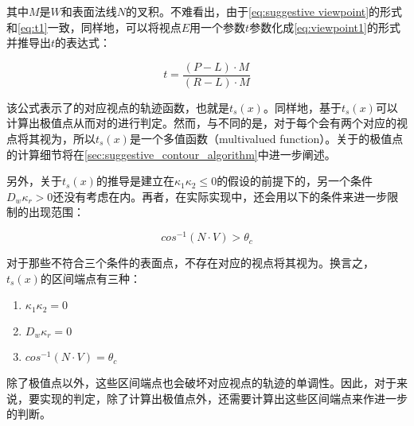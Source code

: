 其中$M$是$W$和表面法线$N$的叉积。不难看出，由于\autoref{eq:suggestive viewpoint}的形式和\autoref{eq:t1}一致，同样地，可以将视点$E$用一个参数$t$参数化成\autoref{eq:viewpoint1}的形式并推导出$t$的表达式：

\begin{equation}\label{eq:suggestive trajectory}
    t = \frac{(P-L)\cdot{M}}{(R-L)\cdot{M}}
\end{equation}

该公式表示了\scon{}的对应视点的轨迹函数，也就是$t_s(x)$。同样地，基于$t_s(x)$可以计算出极值点从而对\scon{}的\epsl{}进行判定。然而，与\con{}不同的是，对于每个\sconp{}会有两个对应的视点将其视为\sconp{}，所以$t_s(x)$是一个多值函数（multivalued function）。关于\scon{}的极值点的计算细节将在\ref{sec:suggestive_contour_algorithm}中进一步阐述。

另外，关于$t_s(x)$的推导是建立在$\kappa_1\kappa_2 \leq 0$的假设的前提下的，另一个条件$D_w\kappa_r>0$还没有考虑在内。再者，在实际实现中，还会用以下的条件来进一步限制\scon{}的出现范围：

\begin{equation}\label{eq:cosNdotV}
  cos^{-1}(N\cdot{V}) > \theta_c 
\end{equation}

对于那些不符合三个条件的表面点，不存在对应的视点将其视为\sconp{}。换言之，$t_s(x)$的区间端点有三种：

\begin{enumerate}
\item $\kappa_1\kappa_2 = 0$
\item $D_w\kappa_r = 0$
\item $cos^{-1}(N\cdot{V}) = \theta_c$
\end{enumerate}

除了极值点以外，这些区间端点也会破坏对应视点的轨迹的单调性。因此，对于\scon{}来说，要实现\epsl{}的判定，除了计算出极值点外，还需要计算出这些区间端点来作进一步的判断。